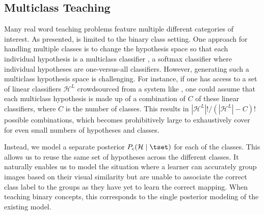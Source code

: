 \documentclass[../main.tex]{subfiles}
\begin{document}
\subsection{Multiclass Teaching}
Many real word teaching problems feature multiple different categories of interest. 
As presented, \STRICT is limited to the binary class setting.
One approach for handling multiple classes is to change the hypothesis space so that each individual hypothesis is a multiclass classifier \eg, a softmax classifier where individual hypotheses are one-versus-all classifiers.
However, generating such a multiclass hypothesis space is challenging.
For instance, if one has access to a set of linear classifiers $\mathcal{H}^L$ \eg crowdsourced from a system like \cite{welinder2010multidimensional}, one could assume that each multiclass hypothesis is made up of a combination of $C$ of these linear classifiers, where $C$ is the number of classes.
This results in $|\mathcal{H}^L|! / (|\mathcal{H}^L|-C)!$ possible combinations, which becomes prohibitively large to exhaustively cover for even small numbers of hypotheses and classes.

Instead, we model a separate posterior $P_c(\mathcal{H}\mid \tset)$ for each of the classes.
This allows us to reuse the same set of hypotheses across the different classes. 
It naturally enables us to model the situation where a learner can accurately group images based on their visual similarity but are unable to associate the correct class label to the groups as they have yet to learn the correct mapping.
When teaching binary concepts, this corresponds to the single posterior modeling of the existing \STRICT model.
\end{document}
